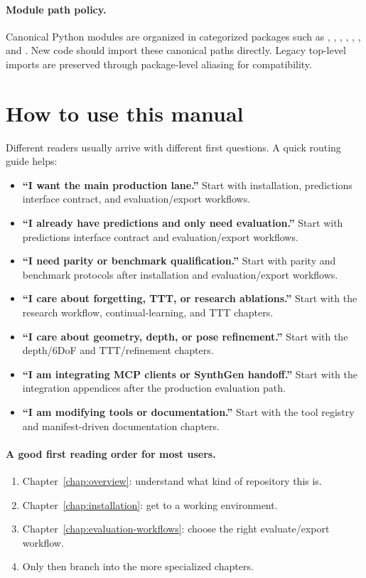 \paragraph{Module path policy.}
Canonical Python modules are organized in categorized packages such as
, , ,
, , , and
. New code should import these canonical paths directly.
Legacy top-level imports are preserved through package-level aliasing for compatibility.

\section{How to use this manual}
Different readers usually arrive with different first questions. A quick routing guide helps:
\begin{itemize}
  \item \textbf{``I want the main production lane.''} Start with installation, predictions interface contract, and evaluation/export workflows.
  \item \textbf{``I already have predictions and only need evaluation.''} Start with predictions interface contract and evaluation/export workflows.
  \item \textbf{``I need parity or benchmark qualification.''} Start with parity and benchmark protocols after installation and evaluation/export workflows.
  \item \textbf{``I care about forgetting, TTT, or research ablations.''} Start with the research workflow, continual-learning, and TTT chapters.
  \item \textbf{``I care about geometry, depth, or pose refinement.''} Start with the depth/6DoF and TTT/refinement chapters.
  \item \textbf{``I am integrating MCP clients or SynthGen handoff.''} Start with the integration appendices after the production evaluation path.
  \item \textbf{``I am modifying tools or documentation.''} Start with the tool registry and manifest-driven documentation chapters.
\end{itemize}

\paragraph{A good first reading order for most users.}
\begin{enumerate}
  \item Chapter~\ref{chap:overview}: understand what kind of repository this is.
  \item Chapter~\ref{chap:installation}: get to a working environment.
  \item Chapter~\ref{chap:evaluation-workflows}: choose the right evaluate/export workflow.
  \item Only then branch into the more specialized chapters.
\end{enumerate}

